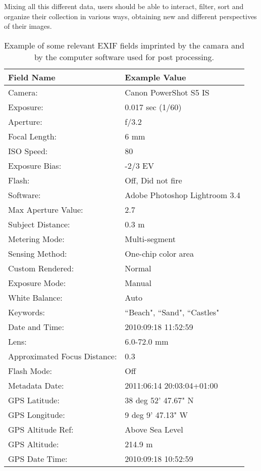 Mixing all this different data, users should be able to interact, filter, sort and organize their collection in various ways, obtaining new and different perspectives of their images.

\begin{table}[h]
\vspace{\baselineskip}
\renewcommand{\arraystretch}{1.4}
\centering
\caption{Example of some relevant EXIF fields imprinted by the camara and by the computer software used for post processing.}
\label{tab:exif}
\vspace{0.2cm}
	\begin{tabular}{ll}
	\textbf{Field Name}			&	\textbf{Example Value}\\
	\hline
	Camera:				&	Canon PowerShot S5 IS\\
	Exposure:			&	0.017 sec (1/60)\\
	Aperture:			&	f/3.2\\
	Focal Length:		&	6 mm\\
	ISO Speed:			&	80\\
	Exposure Bias:		&	-2/3 EV\\
	Flash:				&	Off, Did not fire\\
	Software:			&	Adobe Photoshop Lightroom 3.4\\
	Max Aperture Value:	&	2.7\\
	Subject Distance:	&	0.3 m\\
	Metering Mode:		&	Multi-segment\\
	Sensing Method:		&	One-chip color area\\
	Custom Rendered:	&	Normal\\
	Exposure Mode:		&	Manual\\
	White Balance:		&	Auto\\
	Keywords:			&	``Beach", ``Sand", ``Castles"\\
	Date and Time:		&	2010:09:18 11:52:59\\
	Lens:				&	6.0-72.0 mm\\
	Approximated Focus Distance:	&	0.3\\
	Flash Mode:			&	Off\\
	Metadata Date:		&	2011:06:14 20:03:04+01:00\\
	GPS Latitude: 		&	38 deg 52' 47.67" N\\
	GPS Longitude: 		&	9 deg 9' 47.13" W\\
	GPS Altitude Ref: 	&	Above Sea Level\\
	GPS Altitude: 		&	214.9 m\\
	GPS Date Time:		&	2010:09:18 10:52:59\\
\end{tabular}
\end{table}



